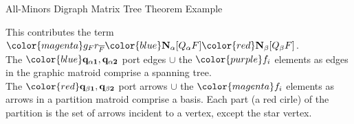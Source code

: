 \documentclass{beamer}
\newcommand{\ext}[1]{\ensuremath{\mathbf{#1}}}
\begin{document}
\begin{frame}{All-Minors Digraph Matrix Tree Theorem Example}
  \begin{center}
    
  \end{center}
  \begin{center}
    This contributes the term\\
    ${\color{magenta}g_F r_{\overline{F}}}{\color{blue}\ext{N}_\alpha[Q_\alpha F]}
    {\color{red}\ext{N}_\beta[Q_\beta F]}$.\\
    The {$\color{blue}\mathbf{q_{\alpha 1},q_{\alpha 2}}$ port edges} $\cup$  the
    {$\color{purple}f_i$} elements {\color{blue}as edges in the graphic matroid} comprise
    a spanning tree.\\
     The {$\color{red}\mathbf{q_{\beta 1},q_{\beta 2}}$ port arrows} $\cup$  the
    {$\color{magenta}f_i$} elements {\color{red} as arrows in a partition matroid} comprise
    a basis.  Each {\color{red}part (a red cirle)} of the partition is the
    set of {\color{red}arrows} incident to a vertex, except the star vertex.
  \end{center}
\end{frame}


\end{document}
